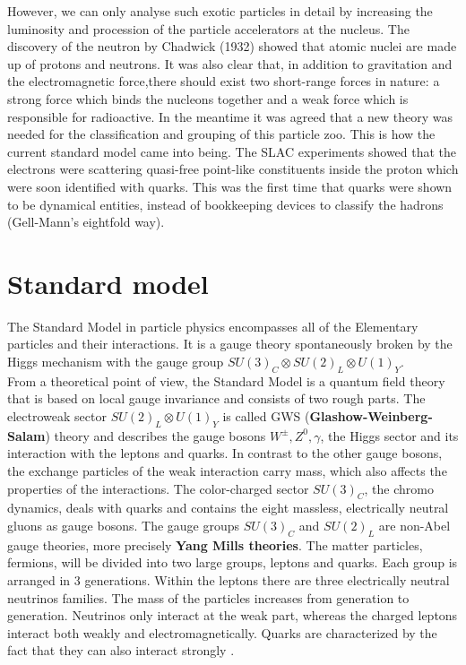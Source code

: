 However, we can only analyse such exotic particles in detail by increasing the luminosity and procession of the particle accelerators at the nucleus. 
The discovery of the neutron by Chadwick (1932) showed that atomic nuclei are made up of protons and neutrons. It was also clear that, in addition to gravitation and the electromagnetic force,there should exist two short-range forces in nature: a strong force which binds the nucleons together and a weak force which is responsible for radioactive.
In the meantime it was agreed that a new theory was needed for the classification and grouping of this particle zoo. This is how the current standard model came into being.
The SLAC experiments showed that the electrons were scattering quasi-free point-like constituents inside the proton which were
soon identified with quarks. This was the first time that quarks
were shown to be dynamical entities, instead of bookkeeping devices to classify the hadrons (Gell-Mann’s eightfold way). \cite{griffiths2008introduction}
\pagebreak
\section{Standard model}
The Standard Model in particle physics encompasses all of the
Elementary particles and their interactions. It is a gauge theory spontaneously broken by the Higgs mechanism with the gauge group $ SU(3)_C \otimes SU(2)_L \otimes U(1)_Y $.\\
From a theoretical point of view, the Standard Model is a quantum field theory that is based on local gauge invariance and consists of two rough parts. The electroweak sector $ SU(2)_L \otimes U(1)_Y $ is called GWS (\textbf{Glashow-Weinberg-Salam}) theory and describes the gauge bosons $ W^{\pm}, Z^0, \gamma $, the Higgs sector and its interaction with the leptons and quarks. In contrast to the other gauge bosons, the exchange particles of the weak interaction carry mass, which also affects the properties of the interactions. The color-charged sector $ SU(3)_C $, the chromo dynamics, deals with quarks and contains the eight massless, electrically neutral gluons as gauge bosons. The gauge groups $SU(3)_C$ and $SU(2)_L$ are non-Abel gauge theories, more precisely \textbf{Yang Mills theories}.
The matter particles, fermions, will be divided into two large groups, leptons and quarks. Each group is arranged in 3 generations. Within the leptons there are three electrically neutral neutrinos families. The mass of the particles increases from generation to generation. Neutrinos only interact at the weak part, whereas the charged leptons interact both weakly and electromagnetically. Quarks are characterized by the fact that they can also interact strongly \cite{edelhaeuser2016tutorium}. 


